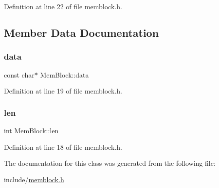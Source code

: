 Definition at line 22 of file memblock.\+h.



\subsection{Member Data Documentation}
\mbox{\label{class_mem_block_affd84af605d6507c4ff6d30d70c18035}} 
\subsubsection{\texorpdfstring{data}{data}}
{\footnotesize\ttfamily const char$\ast$ Mem\+Block\+::data}



Definition at line 19 of file memblock.\+h.

\mbox{\label{class_mem_block_a89d82a47f5c01211ef9957a0a527931b}} 
\subsubsection{\texorpdfstring{len}{len}}
{\footnotesize\ttfamily int Mem\+Block\+::len}



Definition at line 18 of file memblock.\+h.



The documentation for this class was generated from the following file\+:\begin{DoxyCompactItemize}
\item 
include/\hyperlink{memblock_8h}{memblock.\+h}\end{DoxyCompactItemize}
